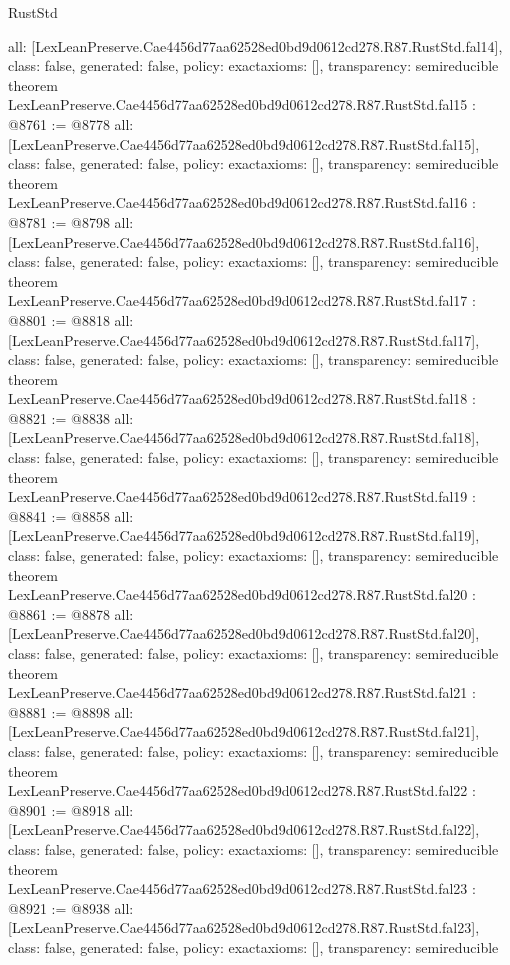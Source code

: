 \begin{lexlean}{RustStd}
\begin{coremodule}
{  all: [LexLeanPreserve.Cae4456d77aa62528ed0bd9d0612cd278.R87.RustStd.fal14],
  class: false,
  generated: false,
  policy: exact{axioms: []},
  transparency: semireducible
}
theorem LexLeanPreserve.Cae4456d77aa62528ed0bd9d0612cd278.R87.RustStd.fal15 : @8761 := @8778 {
  all: [LexLeanPreserve.Cae4456d77aa62528ed0bd9d0612cd278.R87.RustStd.fal15],
  class: false,
  generated: false,
  policy: exact{axioms: []},
  transparency: semireducible
}
theorem LexLeanPreserve.Cae4456d77aa62528ed0bd9d0612cd278.R87.RustStd.fal16 : @8781 := @8798 {
  all: [LexLeanPreserve.Cae4456d77aa62528ed0bd9d0612cd278.R87.RustStd.fal16],
  class: false,
  generated: false,
  policy: exact{axioms: []},
  transparency: semireducible
}
theorem LexLeanPreserve.Cae4456d77aa62528ed0bd9d0612cd278.R87.RustStd.fal17 : @8801 := @8818 {
  all: [LexLeanPreserve.Cae4456d77aa62528ed0bd9d0612cd278.R87.RustStd.fal17],
  class: false,
  generated: false,
  policy: exact{axioms: []},
  transparency: semireducible
}
theorem LexLeanPreserve.Cae4456d77aa62528ed0bd9d0612cd278.R87.RustStd.fal18 : @8821 := @8838 {
  all: [LexLeanPreserve.Cae4456d77aa62528ed0bd9d0612cd278.R87.RustStd.fal18],
  class: false,
  generated: false,
  policy: exact{axioms: []},
  transparency: semireducible
}
theorem LexLeanPreserve.Cae4456d77aa62528ed0bd9d0612cd278.R87.RustStd.fal19 : @8841 := @8858 {
  all: [LexLeanPreserve.Cae4456d77aa62528ed0bd9d0612cd278.R87.RustStd.fal19],
  class: false,
  generated: false,
  policy: exact{axioms: []},
  transparency: semireducible
}
theorem LexLeanPreserve.Cae4456d77aa62528ed0bd9d0612cd278.R87.RustStd.fal20 : @8861 := @8878 {
  all: [LexLeanPreserve.Cae4456d77aa62528ed0bd9d0612cd278.R87.RustStd.fal20],
  class: false,
  generated: false,
  policy: exact{axioms: []},
  transparency: semireducible
}
theorem LexLeanPreserve.Cae4456d77aa62528ed0bd9d0612cd278.R87.RustStd.fal21 : @8881 := @8898 {
  all: [LexLeanPreserve.Cae4456d77aa62528ed0bd9d0612cd278.R87.RustStd.fal21],
  class: false,
  generated: false,
  policy: exact{axioms: []},
  transparency: semireducible
}
theorem LexLeanPreserve.Cae4456d77aa62528ed0bd9d0612cd278.R87.RustStd.fal22 : @8901 := @8918 {
  all: [LexLeanPreserve.Cae4456d77aa62528ed0bd9d0612cd278.R87.RustStd.fal22],
  class: false,
  generated: false,
  policy: exact{axioms: []},
  transparency: semireducible
}
theorem LexLeanPreserve.Cae4456d77aa62528ed0bd9d0612cd278.R87.RustStd.fal23 : @8921 := @8938 {
  all: [LexLeanPreserve.Cae4456d77aa62528ed0bd9d0612cd278.R87.RustStd.fal23],
  class: false,
  generated: false,
  policy: exact{axioms: []},
  transparency: semireducible
}
\end{coremodule}
\end{lexlean}
